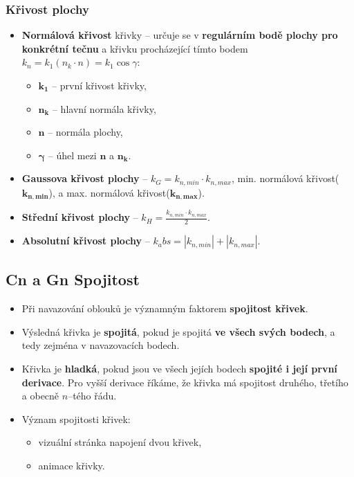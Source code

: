 \subsubsection{Křivost plochy}
\begin{itemize}
	\item \textbf{Normálová křivost} křivky -- určuje se v \textbf{regulárním bodě plochy pro konkrétní tečnu} a křivku procházející tímto bodem $k_n = k_1(n_k \cdot n) = k_1 \cos{\gamma}$:
	\begin{itemize}
\item 	 $\mathbf{k_1}$ -- první křivost křivky,
\item 	 $\mathbf{n_k}$ -- hlavní normála křivky,
\item 	 $\mathbf{n}$ -- normála plochy,
\item 	 $\mathbf{\gamma}$ -- úhel mezi $\mathbf{n}$ a $\mathbf{n_k}$.
\end{itemize}
	\item \textbf{Gaussova křivost plochy} -- $k_G = k_{n,min} \cdot k_{n,max}$, min. normálová křivost($\mathbf{k_{n,min}}$), a max. normálová křivost($\mathbf{k_{n,max}}$).
	\item \textbf{Střední křivost plochy} -- $k_H = \frac{k_{n,min} \cdot k_{n,max}}{2}$.
	\item \textbf{Absolutní křivost plochy} -- $k_abs = |k_{n,min}| + |k_{n,max}|$.
\end{itemize}
\subsection{Cn a Gn Spojitost}
\begin{itemize}
\item Při navazování oblouků je významným faktorem \textbf{spojitost křivek}. 
\item Výsledná křivka je \textbf{spojitá}, pokud je spojitá \textbf{ve všech svých bodech}, a tedy zejména v navazovacích bodech. 
\item Křivka je \textbf{hladká}, pokud jsou ve všech jejích bodech \textbf{spojité i její první derivace}. Pro vyšší derivace říkáme, že křivka má spojitost druhého, třetího a obecně $n$--tého řádu.
\item Význam spojitosti křivek:
	\begin{itemize}
	\item vizuální stránka napojení dvou křivek,
	\item animace křivky.
	\end{itemize}
\end{itemize}
